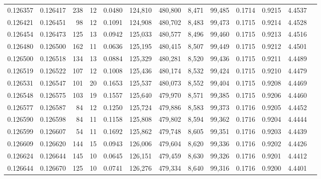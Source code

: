 \begin{tabular}{rrrrrrrrrrrrr}
0.126357 & 0.126417 &   238 &  12 &                                     0.0480 & 124,810 & 480,800 &   8,471 &  99,485 & 0.1714 & 0.9215 & 4.4537 \\
0.126421 & 0.126451 &    98 &  12 &                                     0.1091 & 124,908 & 480,702 &   8,483 &  99,473 & 0.1715 & 0.9214 & 4.4528 \\
0.126454 & 0.126473 &   125 &  13 &                                     0.0942 & 125,033 & 480,577 &   8,496 &  99,460 & 0.1715 & 0.9213 & 4.4516 \\
0.126480 & 0.126500 &   162 &  11 &                                     0.0636 & 125,195 & 480,415 &   8,507 &  99,449 & 0.1715 & 0.9212 & 4.4501 \\
0.126500 & 0.126518 &   134 &  13 &                                     0.0884 & 125,329 & 480,281 &   8,520 &  99,436 & 0.1715 & 0.9211 & 4.4489 \\
0.126519 & 0.126522 &   107 &  12 &                                     0.1008 & 125,436 & 480,174 &   8,532 &  99,424 & 0.1715 & 0.9210 & 4.4479 \\
0.126531 & 0.126547 &   101 &  20 &                                     0.1653 & 125,537 & 480,073 &   8,552 &  99,404 & 0.1715 & 0.9208 & 4.4469 \\
0.126548 & 0.126575 &   103 &  19 &                                     0.1557 & 125,640 & 479,970 &   8,571 &  99,385 & 0.1715 & 0.9206 & 4.4460 \\
0.126577 & 0.126587 &    84 &  12 &                                     0.1250 & 125,724 & 479,886 &   8,583 &  99,373 & 0.1716 & 0.9205 & 4.4452 \\
0.126590 & 0.126598 &    84 &  11 &                                     0.1158 & 125,808 & 479,802 &   8,594 &  99,362 & 0.1716 & 0.9204 & 4.4444 \\
0.126599 & 0.126607 &    54 &  11 &                                     0.1692 & 125,862 & 479,748 &   8,605 &  99,351 & 0.1716 & 0.9203 & 4.4439 \\
0.126609 & 0.126620 &   144 &  15 &                                     0.0943 & 126,006 & 479,604 &   8,620 &  99,336 & 0.1716 & 0.9202 & 4.4426 \\
0.126624 & 0.126644 &   145 &  10 &                                     0.0645 & 126,151 & 479,459 &   8,630 &  99,326 & 0.1716 & 0.9201 & 4.4412 \\
0.126644 & 0.126670 &   125 &  10 &                                     0.0741 & 126,276 & 479,334 &   8,640 &  99,316 & 0.1716 & 0.9200 & 4.4401 \\

\end{tabular}

